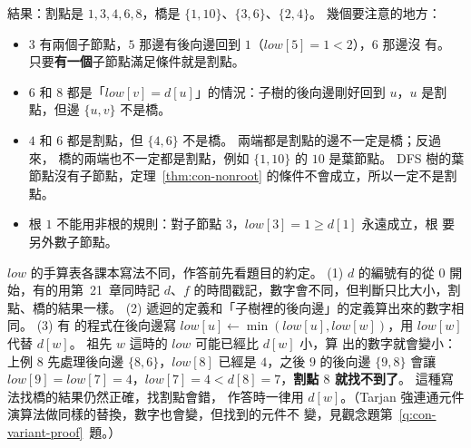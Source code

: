 結果：割點是 $1, 3, 4, 6, 8$，橋是 $\{1, 10\}$、$\{3, 6\}$、$\{2, 4\}$。 幾個要注意的地方：

\begin{itemize}
\item $3$ 有兩個子節點，$5$ 那邊有後向邊回到 $1$（$\mathit{low}[5] = 1 < 2$），$6$ 那邊沒
有。 只要\textbf{有一個}子節點滿足條件就是割點。
\item $6$ 和 $8$ 都是「$\mathit{low}[v] = d[u]$」的情況：子樹的後向邊剛好回到 $u$，$u$
是割點，但邊 $\{u, v\}$ 不是橋。
\item $4$ 和 $6$ 都是割點，但 $\{4, 6\}$ 不是橋。 兩端都是割點的邊不一定是橋；反過來，
橋的兩端也不一定都是割點，例如 $\{1, 10\}$ 的 $10$ 是葉節點。 DFS 樹的葉節點沒有子節點，定理~\ref{thm:con-nonroot} 的條件不會成立，所以一定不是割點。
\item 根 $1$ 不能用非根的規則：對子節點 $3$，$\mathit{low}[3] = 1 \ge d[1]$ 永遠成立，根
要另外數子節點。
\end{itemize}

\begin{center}
\label{fig:con-corridor-cut}
\end{center}

\begin{examnote}
$\mathit{low}$ 的手算表各課本寫法不同，作答前先看題目的約定。 (1) $d$ 的編號有的從
$0$ 開始，有的用第~21~章同時記 $d$、$f$ 的時間戳記，數字會不同，但判斷只比大小，割
點、橋的結果一樣。 (2) 遞迴的定義和「子樹裡的後向邊」的定義算出來的數字相同。 (3) 有
的程式在後向邊寫 $\mathit{low}[u] \gets \min(\mathit{low}[u], \mathit{low}[w])$，用
$\mathit{low}[w]$ 代替 $d[w]$。 祖先 $w$ 這時的 $\mathit{low}$ 可能已經比 $d[w]$ 小，算
出的數字就會變小：上例 $8$ 先處理後向邊 $\{8, 6\}$，$\mathit{low}[8]$ 已經是 $4$，之後
$9$ 的後向邊 $\{9, 8\}$ 會讓 $\mathit{low}[9] = \mathit{low}[7] = 4$，$\mathit{low}[7] = 4
< d[8] = 7$，\textbf{割點 $8$ 就找不到了}。 這種寫法找橋的結果仍然正確，找割點會錯，
作答時一律用 $d[w]$。（Tarjan 強連通元件演算法做同樣的替換，數字也會變，但找到的元件不
變，見觀念題第~\ref{q:con-variant-proof}~題。）
\end{examnote}

